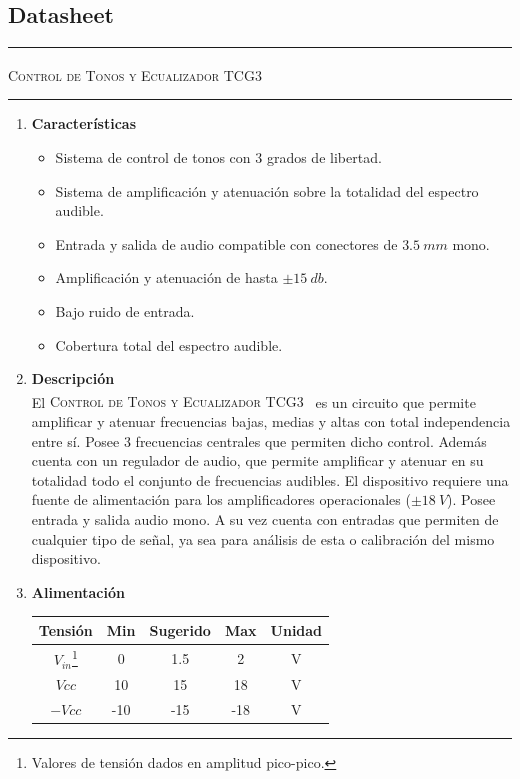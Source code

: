 



\subsection{Datasheet}

\begin{center}
\rule{\textwidth}{1pt}
\textsc{Control de Tonos y Ecualizador TCG3 \textsuperscript{\textregistered}}
\rule{\textwidth}{1pt}
\end{center}

\begin{multicols}{2}

\begin{enumerate}
	\item[1] \textbf{Características}
	\begin{itemize}
		\item Sistema de control de tonos con 3 grados de libertad.
		\item Sistema de amplificación y atenuación sobre la totalidad del espectro audible.
		\item Entrada y salida de audio compatible con conectores de $3.5 \ mm$ mono.
		\item Amplificación y atenuación de hasta $\pm 15 \ db$.
		\item Bajo ruido de entrada.
		\item Cobertura total del espectro audible.
	\end{itemize}
	
	\item[2] \textbf{Descripción}\\
		El \textsc{Control de Tonos y Ecualizador TCG3~\textsuperscript{\textregistered}} es un circuito que permite amplificar y atenuar frecuencias bajas, medias y altas con total independencia entre sí. Posee 3 frecuencias centrales que permiten dicho control. Además cuenta con un regulador de audio, que permite amplificar y atenuar en su totalidad todo el conjunto de frecuencias audibles. El dispositivo requiere una fuente de alimentación para los amplificadores operacionales ($\pm 18 \ V$). Posee entrada y salida audio mono. A su vez cuenta con entradas que permiten de cualquier tipo de señal, ya sea para análisis de esta o calibración del mismo dispositivo.
	
	\item[3] \textbf{Alimentación}
	\begin{table}[H]
		\begin{tabular}{ccccc}
			\hline	
			Tensión & Min & Sugerido & Max & Unidad \\
			\hline
			$V_{in}$\footnote{Valores de tensión dados en amplitud pico-pico.}    & 0 	& 1.5		   & 2	 	& V \\
			$Vcc$       & 10  	& 15       & 18 	& V \\
			$-Vcc$      & -10 	& -15      & -18 	& V	\\
			\hline
		\end{tabular}
	\end{table}
		

\end{enumerate}
\end{multicols}
